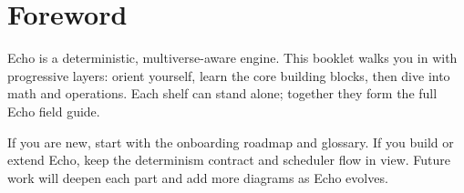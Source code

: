 
\chapter*{Foreword}
Echo is a deterministic, multiverse-aware engine. This booklet walks you in with progressive layers: orient yourself, learn the core building blocks, then dive into math and operations. Each shelf can stand alone; together they form the full Echo field guide.

\bigskip
If you are new, start with the onboarding roadmap and glossary. If you build or extend Echo, keep the determinism contract and scheduler flow in view. Future work will deepen each part and add more diagrams as Echo evolves.

\cleardoublepage
